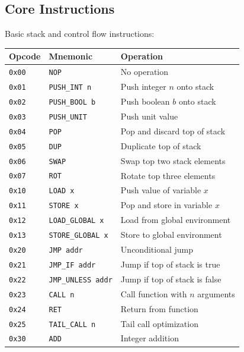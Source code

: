 \subsection{Core Instructions}
\label{subsec:core-instructions}

\begin{definition}
\label{def:core-instructions}
Basic stack and control flow instructions:
\begin{center}
\begin{tabular}{llp{7cm}}
\toprule
\textbf{Opcode} & \textbf{Mnemonic} & \textbf{Operation} \\
\midrule
\texttt{0x00} & \texttt{NOP} & No operation \\
\texttt{0x01} & \texttt{PUSH\_INT n} & Push integer $n$ onto stack \\
\texttt{0x02} & \texttt{PUSH\_BOOL b} & Push boolean $b$ onto stack \\
\texttt{0x03} & \texttt{PUSH\_UNIT} & Push unit value \\
\texttt{0x04} & \texttt{POP} & Pop and discard top of stack \\
\texttt{0x05} & \texttt{DUP} & Duplicate top of stack \\
\texttt{0x06} & \texttt{SWAP} & Swap top two stack elements \\
\texttt{0x07} & \texttt{ROT} & Rotate top three elements \\
\midrule
\texttt{0x10} & \texttt{LOAD x} & Push value of variable $x$ \\
\texttt{0x11} & \texttt{STORE x} & Pop and store in variable $x$ \\
\texttt{0x12} & \texttt{LOAD\_GLOBAL x} & Load from global environment \\
\texttt{0x13} & \texttt{STORE\_GLOBAL x} & Store to global environment \\
\midrule
\texttt{0x20} & \texttt{JMP addr} & Unconditional jump \\
\texttt{0x21} & \texttt{JMP\_IF addr} & Jump if top of stack is true \\
\texttt{0x22} & \texttt{JMP\_UNLESS addr} & Jump if top of stack is false \\
\texttt{0x23} & \texttt{CALL n} & Call function with $n$ arguments \\
\texttt{0x24} & \texttt{RET} & Return from function \\
\texttt{0x25} & \texttt{TAIL\_CALL n} & Tail call optimization \\
\midrule
\texttt{0x30} & \texttt{ADD} & Integer addition \\

\end{tabular}
\end{center}
\end{definition}
